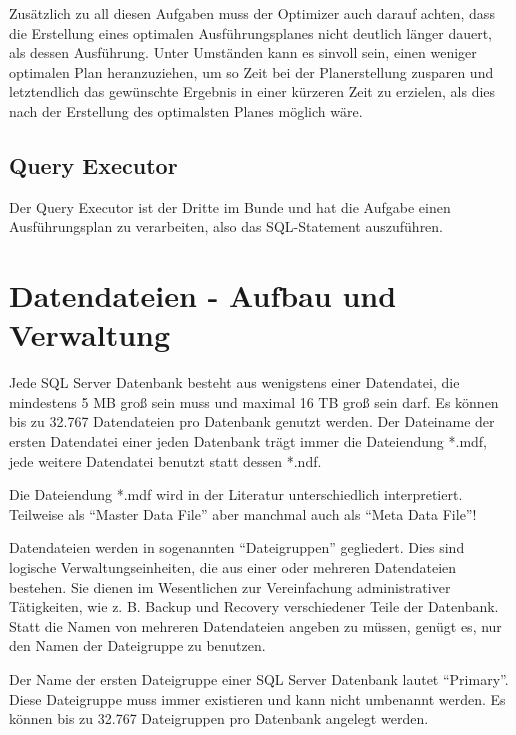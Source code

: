         Zusätzlich zu all diesen Aufgaben muss der Optimizer auch darauf
        achten, dass die Erstellung eines optimalen Ausführungsplanes nicht
        deutlich länger dauert, als dessen Ausführung. Unter Umständen
        kann es sinvoll sein, einen weniger optimalen Plan heranzuziehen, um so
        Zeit bei der Planerstellung zusparen und letztendlich das gewünschte 
        Ergebnis in einer kürzeren Zeit zu erzielen, als dies nach der
        Erstellung des optimalsten Planes möglich wäre.
      \subsection{Query Executor}
        Der Query Executor ist der Dritte im Bunde und hat die Aufgabe einen
        Ausführungsplan zu verarbeiten, also das SQL-Statement auszuführen.
        \begin{literaturinternet}
          \item \cite{dn205319}
        \end{literaturinternet}                
    \section{Datendateien - Aufbau und Verwaltung}
      Jede SQL Server Datenbank besteht aus wenigstens einer Datendatei, die
      mindestens 5 MB groß sein muss und maximal 16 TB groß sein darf.
      Es können bis zu 32.767 Datendateien pro Datenbank genutzt werden. Der
      Dateiname der ersten Datendatei einer jeden Datenbank trägt immer die
      Dateiendung *.mdf, jede weitere Datendatei benutzt statt dessen *.ndf.
      \begin{merke}
        Die Dateiendung *.mdf wird in der Literatur unterschiedlich
        interpretiert. Teilweise als \enquote{Master Data File} aber manchmal
        auch als \enquote{Meta Data File}!
      \end{merke}
      Datendateien werden in sogenannten \enquote{Dateigruppen} gegliedert.   
      Dies sind logische Verwaltungseinheiten, die aus einer oder mehreren
      Datendateien bestehen. Sie dienen im Wesentlichen zur Vereinfachung
      administrativer Tätigkeiten, wie z. B. Backup und Recovery
      verschiedener Teile der Datenbank. Statt die Namen von mehreren
      Datendateien angeben zu müssen, genügt es, nur den Namen der
      Dateigruppe zu benutzen.
      \begin{merke}
        Der Name der ersten Dateigruppe einer SQL Server Datenbank lautet
        \enquote{Primary}. Diese Dateigruppe muss immer existieren und kann
        nicht umbenannt werden. Es können bis zu 32.767 Dateigruppen pro
        Datenbank angelegt werden.
      \end{merke}
